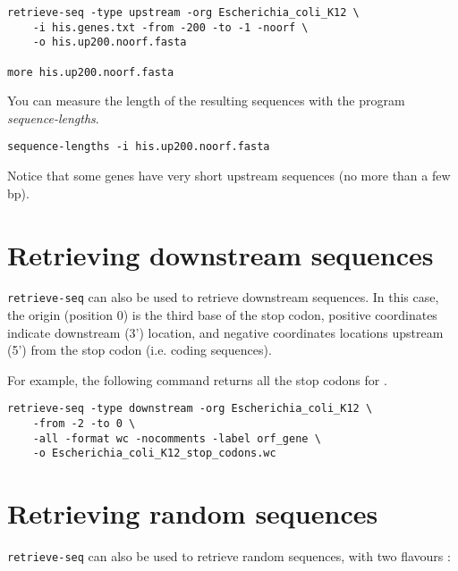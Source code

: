 {\color{blue} \begin{footnotesize}
\begin{verbatim}
retrieve-seq -type upstream -org Escherichia_coli_K12 \
    -i his.genes.txt -from -200 -to -1 -noorf \
    -o his.up200.noorf.fasta

more his.up200.noorf.fasta
\end{verbatim}\end{footnotesize}}

You can measure the length of the resulting sequences with the program
\textit{sequence-lengths}.

{\color{blue} \begin{footnotesize}
\begin{verbatim}
sequence-lengths -i his.up200.noorf.fasta
\end{verbatim}\end{footnotesize}}

Notice that some genes have very short upstream sequences (no more
than a few bp).

\section{Retrieving downstream sequences}

\texttt{retrieve-seq} can also be used to retrieve downstream
sequences. In this case, the origin (position 0) is the third base of
the stop codon, positive coordinates indicate downstream (3')
location, and negative coordinates locations upstream (5') from the
stop codon (i.e. coding sequences). 

For example, the following command returns all the stop codons for
.

{\color{blue} \begin{footnotesize}
\begin{verbatim}
retrieve-seq -type downstream -org Escherichia_coli_K12 \
    -from -2 -to 0 \
    -all -format wc -nocomments -label orf_gene \
    -o Escherichia_coli_K12_stop_codons.wc
\end{verbatim}\end{footnotesize}}

\section{Retrieving random sequences}

\texttt{retrieve-seq} can also be used to retrieve random sequences,
with two flavours :

